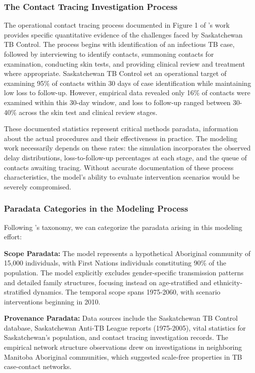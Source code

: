 
\subsubsection{The Contact Tracing Investigation Process}

The operational contact tracing process documented in Figure 1 of \citeauthor{tian_evaluating_2013}'s work provides specific quantitative evidence of the challenges faced by Saskatchewan TB Control.
The process begins with identification of an infectious TB case, followed by interviewing to identify contacts, summoning contacts for examination, conducting skin tests, and providing clinical review and treatment where appropriate.
Saskatchewan TB Control set an operational target of examining 95\% of contacts within 30 days of case identification while maintaining low loss to follow-up.
However, empirical data revealed only 16\% of contacts were examined within this 30-day window, and loss to follow-up ranged between 30-40\% across the skin test and clinical review stages.

These documented statistics represent critical methods paradata, information about the actual procedures and their effectiveness in practice.
The modeling work necessarily depends on these rates: the simulation incorporates the observed delay distributions, loss-to-follow-up percentages at each stage, and the queue of contacts awaiting tracing.
Without accurate documentation of these process characteristics, the model's ability to evaluate intervention scenarios would be severely compromised.

\subsubsection{Paradata Categories in the Modeling Process}

Following \citeauthor{huvilaPerspectivesParadataResearch2024}'s taxonomy, we can categorize the paradata arising in this modeling effort:

\textbf{Scope Paradata:} The model represents a hypothetical Aboriginal community of 15,000 individuals, with First Nations individuals constituting 90\% of the population.
The model explicitly excludes gender-specific transmission patterns and detailed family structures, focusing instead on age-stratified and ethnicity-stratified dynamics.
The temporal scope spans 1975-2060, with scenario interventions beginning in 2010.

\textbf{Provenance Paradata:} Data sources include the Saskatchewan TB Control database, Saskatchewan Anti-TB League reports (1975-2005), vital statistics for Saskatchewan's population, and contact tracing investigation records.
The empirical network structure observations drew on investigations in neighboring Manitoba Aboriginal communities, which suggested scale-free properties in TB case-contact networks.

